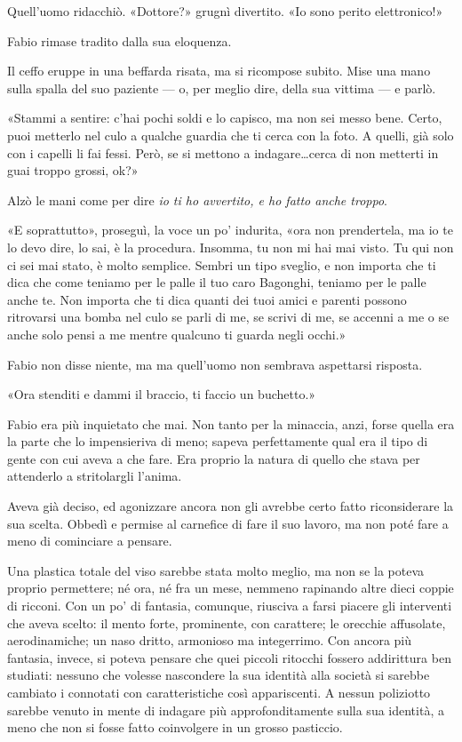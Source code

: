 Quell'uomo ridacchiò. «Dottore?» grugnì divertito. «Io sono perito elettronico!» 

Fabio rimase tradito dalla sua eloquenza.

Il ceffo eruppe in una beffarda risata, ma si ricompose subito. Mise una mano sulla spalla del suo paziente --- o, per meglio dire, della sua vittima --- e parlò.

«Stammi a sentire: c'hai pochi soldi e lo capisco, ma non sei messo bene. Certo, puoi metterlo nel culo a qualche guardia che ti cerca con la foto. A quelli, già solo con i capelli li fai fessi. Però, se si mettono a indagare\ldots \thinspace cerca di non metterti in guai troppo grossi, ok?»

Alzò le mani come per dire \textit{io ti ho avvertito, e ho fatto anche troppo}.

«E soprattutto», proseguì, la voce un po' indurita, «ora non prendertela, ma io te lo devo dire, lo sai, è la procedura. Insomma, tu non mi hai mai visto. Tu qui non ci sei mai stato, è molto semplice. Sembri un tipo sveglio, e non importa che ti dica che come teniamo per le palle il tuo caro Bagonghi, teniamo per le palle anche te. Non importa che ti dica quanti dei tuoi amici e parenti possono ritrovarsi una bomba nel culo se parli di me, se scrivi di me, se accenni a me o se anche solo pensi a me mentre qualcuno ti guarda negli occhi.»

Fabio non disse niente, ma ma quell'uomo non sembrava aspettarsi risposta.

«Ora stenditi e dammi il braccio, ti faccio un buchetto.»

Fabio era più inquietato che mai. Non tanto per la minaccia, anzi, forse quella era la parte che lo impensieriva di meno; sapeva perfettamente qual era il tipo di gente con cui aveva a che fare. Era proprio la natura di quello che stava per attenderlo a stritolargli l'anima.

Aveva già deciso, ed agonizzare ancora non gli avrebbe certo fatto riconsiderare la sua scelta. Obbedì e permise al carnefice di fare il suo lavoro, ma non poté fare a meno di cominciare a pensare.

Una plastica totale del viso sarebbe stata molto meglio, ma non se la poteva proprio permettere; né ora, né fra un mese, nemmeno rapinando altre dieci coppie di ricconi. Con un po' di fantasia, comunque, riusciva a farsi piacere gli interventi che aveva scelto: il mento forte, prominente, con carattere; le orecchie affusolate, aerodinamiche; un naso dritto, armonioso ma integerrimo. Con ancora più fantasia, invece, si poteva pensare che quei piccoli ritocchi fossero addirittura ben studiati: nessuno che volesse nascondere la sua identità alla società si sarebbe cambiato i connotati con caratteristiche così appariscenti. A nessun poliziotto sarebbe venuto in mente di indagare più approfonditamente sulla sua identità, a meno che non si fosse fatto coinvolgere in un grosso pasticcio. 

